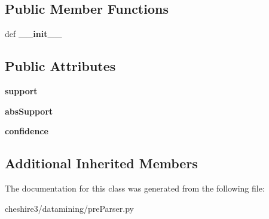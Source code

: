 \subsection*{Public Member Functions}
\begin{DoxyCompactItemize}
\item 
\hypertarget{classcheshire3_1_1datamining_1_1pre_parser_1_1_a_r_m_pre_parser_aed2cd64c5e38d24702727a5ceaaf2038}{def {\bfseries \-\_\-\-\_\-init\-\_\-\-\_\-}}\label{classcheshire3_1_1datamining_1_1pre_parser_1_1_a_r_m_pre_parser_aed2cd64c5e38d24702727a5ceaaf2038}

\end{DoxyCompactItemize}
\subsection*{Public Attributes}
\begin{DoxyCompactItemize}
\item 
\hypertarget{classcheshire3_1_1datamining_1_1pre_parser_1_1_a_r_m_pre_parser_a4a28fcdc7848d2a21f70d283b517a484}{{\bfseries support}}\label{classcheshire3_1_1datamining_1_1pre_parser_1_1_a_r_m_pre_parser_a4a28fcdc7848d2a21f70d283b517a484}

\item 
\hypertarget{classcheshire3_1_1datamining_1_1pre_parser_1_1_a_r_m_pre_parser_a3281c6db7161237fed83a8926537ddfe}{{\bfseries abs\-Support}}\label{classcheshire3_1_1datamining_1_1pre_parser_1_1_a_r_m_pre_parser_a3281c6db7161237fed83a8926537ddfe}

\item 
\hypertarget{classcheshire3_1_1datamining_1_1pre_parser_1_1_a_r_m_pre_parser_aa4545e4e3712605e763a6bad4d217ba4}{{\bfseries confidence}}\label{classcheshire3_1_1datamining_1_1pre_parser_1_1_a_r_m_pre_parser_aa4545e4e3712605e763a6bad4d217ba4}

\end{DoxyCompactItemize}
\subsection*{Additional Inherited Members}


The documentation for this class was generated from the following file\-:\begin{DoxyCompactItemize}
\item 
cheshire3/datamining/pre\-Parser.\-py\end{DoxyCompactItemize}
